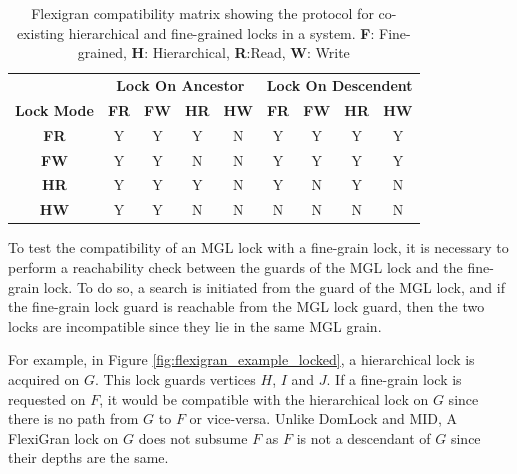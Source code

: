 \begin{table}[h]
    \centering
    \captionsetup{justification=centering}
    \begin{tabular}{c|cccc|cccc|}
        \multicolumn{1}{c}{} & \multicolumn{4}{c|}{\textbf{Lock On Ancestor}} & \multicolumn{4}{c}{\textbf{Lock On Descendent}} \\
        \cline{2-9}
        \textbf{Lock Mode} & \textbf{FR} & \textbf{FW} & \textbf{HR} & \textbf{HW} & \textbf{FR} & \textbf{FW} & \textbf{HR} & \textbf{HW} \\
        \hline
        \textbf{FR} & \cellcolor{green!25} Y & \cellcolor{green!25} Y & \cellcolor{green!25} Y & \cellcolor{red!25} N & \cellcolor{green!25} Y & \cellcolor{green!25} Y & \cellcolor{green!25} Y & \cellcolor{green!25} Y \\
        \textbf{FW} & \cellcolor{green!25} Y & \cellcolor{green!25} Y & \cellcolor{red!25} N & \cellcolor{red!25} N & \cellcolor{green!25} Y & \cellcolor{green!25} Y & \cellcolor{green!25} Y & \cellcolor{green!25} Y \\
        \textbf{HR} & \cellcolor{green!25} Y & \cellcolor{green!25} Y & \cellcolor{green!25} Y & \cellcolor{red!25} N & \cellcolor{green!25} Y & \cellcolor{red!25} N & \cellcolor{green!25} Y & \cellcolor{red!25} N \\
        \textbf{HW} & \cellcolor{green!25} Y & \cellcolor{green!25} Y & \cellcolor{red!25} N & \cellcolor{red!25} N & \cellcolor{red!25} N & \cellcolor{red!25} N & \cellcolor{red!25} N & \cellcolor{red!25} N \\
    \end{tabular}
    \caption{Flexigran compatibility matrix showing the protocol for co-existing hierarchical and fine-grained locks in a system. \textbf{F}: Fine-grained, \textbf{H}: Hierarchical, \textbf{R}:Read, \textbf{W}: Write}
    \label{tab:flexigran_locks}
\end{table}

To test the compatibility of an MGL lock with a fine-grain lock, it is necessary to perform a reachability check between the guards of the MGL lock and the fine-grain lock. To do so, a search is initiated from the guard of the MGL lock, and if the fine-grain lock guard is reachable from the MGL lock guard, then the two locks are incompatible since they lie in the same MGL grain. 

For example, in Figure \ref{fig:flexigran_example_locked}, a hierarchical lock is acquired on $G$. This lock guards vertices $H$, $I$ and $J$. If a fine-grain lock is requested on $F$, it would be compatible with the hierarchical lock on $G$ since there is no path from $G$ to $F$ or vice-versa. Unlike DomLock and MID, A FlexiGran lock on $G$ does not subsume $F$ as $F$ is not a descendant of $G$ since their depths are the same.

